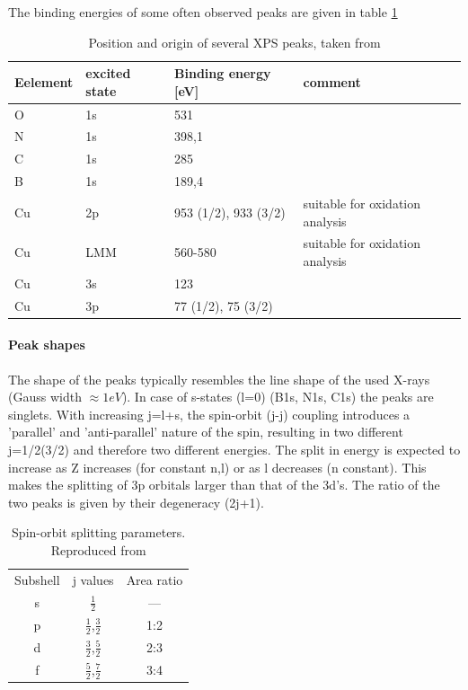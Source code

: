 The  binding energies of some often observed peaks are given in table \ref{tab:XPS-intensities}
\begin{table}\centering
 \caption{Position and origin of several XPS peaks, taken from\cite{wanger_handbook_1979}}
 \begin{tabular}{llll}
  Eelement & excited state & Binding energy [eV]& comment\\ \hline \hline
  O & 1s & 531&\\
  N & 1s & 398,1&\\
  C & 1s & 285&\\
  B & 1s & 189,4& \\
  Cu & 2p & 953 (1/2), 933 (3/2) & suitable for oxidation analysis\\
  Cu & LMM & 560-580 & suitable for oxidation analysis\\
  Cu & 3s & 123 &\\
  Cu & 3p & 77 (1/2), 75 (3/2) & \\
 \end{tabular}
\label{tab:XPS-intensities}
\end{table}
\paragraph{Peak shapes}
The shape of the peaks typically resembles the line shape of the used X-rays (Gauss width $\approx 1eV$). In case of s-states (l=0) (B1s, N1s, C1s) the peaks are singlets. With increasing j=l+s, the spin-orbit (j-j) coupling introduces a 'parallel' and 'anti-parallel' nature of the spin, resulting in two different j=1/2(3/2) and therefore two different energies. The split in energy is expected to increase as Z increases (for constant n,l) or as l decreases (n constant). This makes the splitting of 3p orbitals larger than that of the 3d's. The ratio of the two peaks is given by their degeneracy (2j+1).\cite[113]{Riviere_90}
\begin{table}
\caption{Spin-orbit splitting parameters. Reproduced from \cite{Riviere_90}}
\centering
 \begin{tabular}{ccc}
 Subshell & j values & Area ratio \\
 s & $\frac{1}{2}$ & --- \\
 p & $\frac{1}{2}$,$\frac{3}{2}$ & 1:2 \\
 d & $\frac{3}{2}$,$\frac{5}{2}$ & 2:3 \\
 f & $\frac{5}{2}$,$\frac{7}{2}$ & 3:4 \\
 \end{tabular}
\end{table}


